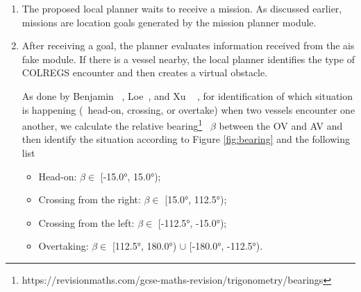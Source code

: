             \begin{enumerate}
            
                \item The proposed local planner waits to receive a mission. As discussed earlier, missions are location goals generated by the mission planner module.
                
                \item After receiving a goal, the planner evaluates information received from the ais fake module. If there is a vessel nearby, the local planner identifies the type of \ac{COLREGS} encounter and then creates a virtual obstacle. 
                
                As done by Benjamin \etal~\cite{Benjamin2006Method}, Loe~\cite{Loe2007Collision}, and Xu \etal~ \cite{Xu2017Deep}, for identification of which situation is happening (\ie~head-on, crossing, or overtake) when two vessels encounter one another, we calculate the relative bearing\footnote{https://revisionmaths.com/gcse-maths-revision/trigonometry/bearings}~\cite{He2017} $\beta$ between the \ac{OV} and \ac{AV} and then identify the situation according to Figure \ref{fig:bearing} and the following list
            
                \begin{itemize}
                    \item Head-on: $\beta \in$ [-15.0°, 15.0°);
                    \item Crossing from the right: $\beta \in$ [15.0°, 112.5°);
                    \item Crossing from the left: $\beta \in$ [-112.5°, -15.0°);
                    \item Overtaking: $\beta \in$ [112.5°, 180.0°) $\cup$ [-180.0°, -112.5°).
                \end{itemize}
                

\end{enumerate}
